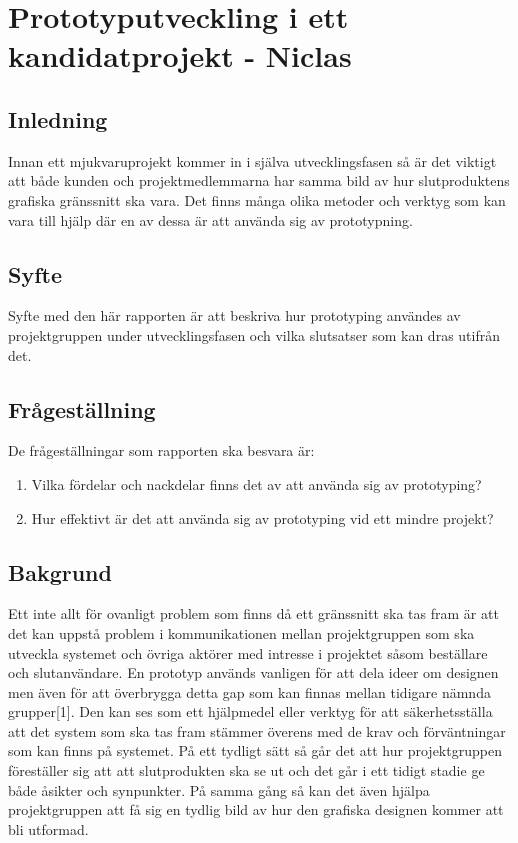 \chapter{Prototyputveckling i ett kandidatprojekt - Niclas}
\section{Inledning}
Innan ett mjukvaruprojekt kommer in i själva utvecklingsfasen så är det viktigt att både kunden och projektmedlemmarna har samma bild av hur slutproduktens grafiska gränssnitt ska vara. Det finns många olika metoder och verktyg som kan vara till hjälp där en av dessa är att använda sig av prototypning.   

\section{Syfte}
Syfte med den här rapporten är att beskriva hur prototyping användes av projektgruppen under utvecklingsfasen och vilka slutsatser som kan dras utifrån det.   

\section{Frågeställning}
De frågeställningar som rapporten ska besvara är:
\begin{enumerate}
	\item Vilka fördelar och nackdelar finns det av att använda sig av prototyping?
	\item Hur effektivt är det att använda sig av prototyping vid ett mindre projekt?
\end{enumerate}

\section{Bakgrund}
Ett inte allt för ovanligt problem som finns då ett gränssnitt ska tas fram är att det kan uppstå problem i kommunikationen mellan projektgruppen som ska utveckla systemet och övriga aktörer med intresse i projektet såsom beställare och slutanvändare. En prototyp används vanligen för att dela ideer om designen men även för att överbrygga detta gap som kan finnas mellan tidigare nämnda grupper[1]. Den kan ses som ett hjälpmedel eller verktyg för att säkerhetsställa att det system som ska tas fram stämmer överens med de krav och förväntningar som kan finns på systemet. På ett tydligt sätt så går det att hur projektgruppen föreställer sig att att slutprodukten ska se ut och det går i ett tidigt stadie ge både åsikter och synpunkter. På samma gång så kan det även hjälpa projektgruppen att få sig en tydlig bild av hur den grafiska designen kommer att bli utformad.

